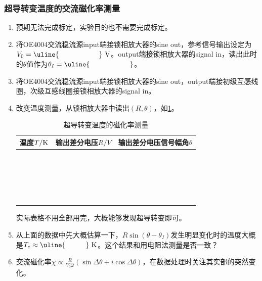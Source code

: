 \documentclass[11pt,a4paper]{ctexart}
\newcommand{\unit}[1]{\rm \ #1}
\begin{document}
\begin{enumerate}
  \end{enumerate}
  
  \subsubsection{超导转变温度的交流磁化率测量}
  \begin{enumerate}
  \item 预期无法完成标定，实验目的也不需要完成标定。
  \item
   将OE4004交流稳流源input端接锁相放大器的sine out，参考信号输出设定为$V_0 = \uline{\hspace{20mm}}\unit{V}$。output端接锁相放大器的signal in，读出此时的$\theta$值作为$\theta_I = \uline{\hspace{20mm}}$。
  \item
  将OE4004交流稳流源input端接锁相放大器的sine out，output端接初级互感线圈，次级互感线圈接锁相放大器的signal in。
  \item
 改变温度测量，从锁相放大器中读出$(R,\theta)$，如\cref{table2}。
  \begin{table}[H]
\centering
\caption{超导转变温度的磁化率测量\label{table2}}
\begin{tabular}{|p{32mm}|p{32mm}|p{32mm}|}
\hline
温度$T/{\rm K}$ & 输出差分电压$R/{V}$ & 输出差分电压信号幅角$\theta$ \\ \hline
 & & \\ \hline
  & & \\ \hline
  & & \\ \hline
   & & \\ \hline
    & & \\ \hline
 & & \\ \hline
  &  &\\ \hline
  &  &\\ \hline
  &  &\\ \hline
  &  &\\ \hline
  &  &\\ \hline
  &  &\\ \hline
  &  &\\ \hline
  &  &\\ \hline
  &  &\\ \hline
  &  &\\ \hline
  &  &\\ \hline
  &  &\\ \hline
    & &\\ \hline
  & &\\ \hline
   & &\\ \hline
  \end{tabular}
  \end{table}
 实际表格不用全部用完，大概能够发现超导转变即可。
 \item
 从上面的数据中先大概估算一下，$R\sin (\theta-\theta_I)$发生明显变化时的温度大概是$T_c \approx \uline{\hspace{10mm}} \unit{K}$。这个结果和用电阻法测量是否一致？
 \item
 交流磁化率$\chi \propto \frac{R}{V_0 \omega} (\sin \Delta \theta + i \cos \Delta \theta)$，在数据处理时关注其实部的突然变化。
 \end{enumerate}
 
\end{document}

